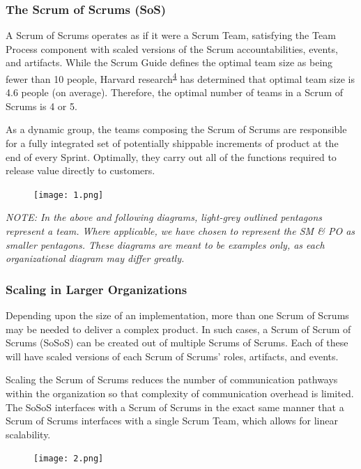 \documentclass[12pt,a4paper,parskip=full]{scrartcl}
\begin{document}
\subsubsection{The Scrum of Scrums (SoS)}\label{the-scrum-of-scrums}

A Scrum of Scrums operates as if it were a Scrum Team, satisfying the Team Process component with scaled versions of the Scrum accountabilities, events, and artifacts. While the Scrum Guide defines the optimal team size as being fewer than 10 people, Harvard research\textsuperscript{\hyperref[citation4]{4}}  has determined that optimal team size is 4.6 people (on average). Therefore, the optimal number of teams in a Scrum of Scrums is 4 or 5.

As a dynamic group, the teams composing the Scrum of Scrums are responsible for a fully integrated set of potentially shippable increments of product at the end of every Sprint. Optimally, they carry out all of the functions required to release value directly to customers.


\begin{figure}[H]
    \centering
    \texttt{[image: 1.png]}
\end{figure}


\emph{
 NOTE: In the above and following diagrams, light-grey outlined pentagons represent a team. Where applicable, we have chosen to represent the SM \& PO as smaller pentagons. These diagrams are meant to be examples only, as each organizational diagram may differ greatly.}

\subsubsection{Scaling in Larger
Organizations}\label{scaling-in-larger-organizations}

Depending upon the size of an implementation, more than one Scrum of
Scrums may be needed to deliver a complex product. In such cases, a
Scrum of Scrum of Scrums (SoSoS) can be created out of multiple Scrums
of Scrums. Each of these will have scaled versions of each Scrum of
Scrums' roles, artifacts, and events.

Scaling the Scrum of Scrums reduces the number of communication pathways
within the organization so that complexity of communication overhead is
limited. The SoSoS interfaces with a Scrum of Scrums in the exact same
manner that a Scrum of Scrums interfaces with a single Scrum Team, which
allows for linear scalability.

\begin{figure}[H]
    \centering
    \texttt{[image: 2.png]}
  
\end{figure}
\end{document}
